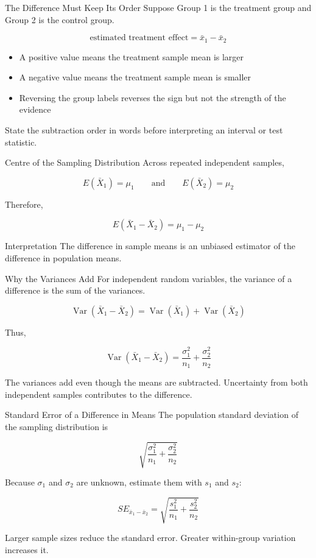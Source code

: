 \documentclass[aspectratio=169,10pt]{beamer}
\begin{document}
\begin{frame}{The Difference Must Keep Its Order}
Suppose Group 1 is the treatment group and Group 2 is the control group.

\[
\text{estimated treatment effect}=\bar{x}_1-\bar{x}_2
\]

\begin{itemize}
  \item A positive value means the treatment sample mean is larger
  \item A negative value means the treatment sample mean is smaller
  \item Reversing the group labels reverses the sign but not the strength of the evidence
\end{itemize}

State the subtraction order in words before interpreting an interval or test statistic.
\end{frame}

\begin{frame}{Centre of the Sampling Distribution}
Across repeated independent samples,

\[
E(\bar{X}_1)=\mu_1
\qquad\text{and}\qquad
E(\bar{X}_2)=\mu_2
\]

Therefore,

\[
E(\bar{X}_1-\bar{X}_2)=\mu_1-\mu_2
\]

\begin{block}{Interpretation}
The difference in sample means is an unbiased estimator of the difference in population means.
\end{block}
\end{frame}

\begin{frame}{Why the Variances Add}
For independent random variables, the variance of a difference is the sum of the variances.

\[
\operatorname{Var}(\bar{X}_1-\bar{X}_2)
=
\operatorname{Var}(\bar{X}_1)+\operatorname{Var}(\bar{X}_2)
\]

Thus,

\[
\operatorname{Var}(\bar{X}_1-\bar{X}_2)
=
\frac{\sigma_1^2}{n_1}+\frac{\sigma_2^2}{n_2}
\]

The variances add even though the means are subtracted. Uncertainty from both independent samples contributes to the difference.
\end{frame}

\begin{frame}{Standard Error of a Difference in Means}
The population standard deviation of the sampling distribution is

\[
\sqrt{\frac{\sigma_1^2}{n_1}+\frac{\sigma_2^2}{n_2}}
\]

Because $\sigma_1$ and $\sigma_2$ are unknown, estimate them with $s_1$ and $s_2$:

\[
SE_{\bar{x}_1-\bar{x}_2}
=
\sqrt{\frac{s_1^2}{n_1}+\frac{s_2^2}{n_2}}
\]

Larger sample sizes reduce the standard error. Greater within-group variation increases it.
\end{frame}
\end{document}
